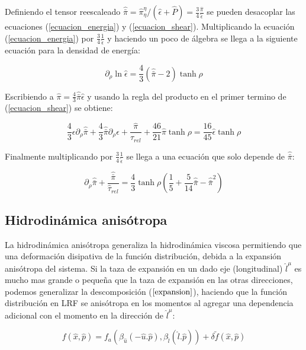 \documentclass[11pt,a4paper]{article}
\begin{document}
Definiendo el tensor reescaleado $\hat{\bar{\pi}}=\hat{\pi}^{\eta}_{\eta}/(\hat{\epsilon}+\hat{P})=\frac{3}{4}\frac{\hat{\pi}}{\hat{\epsilon}}$ se pueden desacoplar las ecuaciones (\ref{ecuacion_energia}) y (\ref{ecuacion_shear}). Multiplicando la ecuación (\ref{ecuacion_energia}) por $\frac{3}{4}\frac{1}{\hat{\epsilon}}$ y haciendo un poco de álgebra se llega a la siguiente ecuación para la densidad de energía:

\begin{equation}
\partial_{\rho}\ln\hat{\epsilon}=
\frac{4}{3}(\hat{\bar{\pi}}-2)\tanh\rho
\end{equation}

Escribiendo a $\hat{\pi}=\frac{4}{3}\hat{\bar{\pi}}\hat{\epsilon}$ y usando la regla del producto en el primer termino de (\ref{ecuacion_shear}) se obtiene:

\begin{equation}
\frac{4}{3}\epsilon\partial_{\rho}\hat{\bar{\pi}}
+\frac{4}{3}\hat{\bar{\pi}}\partial_{\rho}\epsilon
+\frac{\hat{\pi}}{\hat{\tau}_{rel}}
+\frac{46}{21}\hat{\pi}\tanh\rho=
\frac{16}{45}\hat{\epsilon}\tanh\rho
\end{equation}

Finalmente multiplicando por $\frac{3}{4}\frac{1}{\hat{\epsilon}}$ se llega a una ecuación que solo depende de $\hat{\bar{\pi}}$:

\begin{equation}
\partial_{\rho}\hat{\bar{\pi}}+\frac{\hat{\bar{\pi}}}{\hat{\tau}_{rel}}=
\frac{4}{3}\tanh\rho(\frac{1}{5}+\frac{5}{14}\hat{\bar{\pi}}-\hat{\bar{\pi}}^2)
\end{equation}


\subsection{Hidrodinámica anisótropa}

La hidrodinámica anisótropa generaliza la hidrodinámica viscosa permitiendo que una deformación disipativa de la función distribución, debida a la expansión anisótropa del sistema. Si la taza de expansión en un dado eje (longitudinal) $\hat{l}^{\mu}$ es mucho mas grande o pequeña que la taza de expansión en las otras direcciones, podemos generalizar la descomposición ($\ref{expansion}$), haciendo que la función distribución en LRF se anisótropa en los momentos al agregar una dependencia adicional con el momento en la dirección de $\hat{l}^{\mu}$:

\begin{equation}
f( \hat{x}, \hat{p})=
f_{a}(\beta_{\hat{u}}(-\hat{u}.\hat{p}),\beta_{\hat{l}}(\hat{l}.\hat{p}))+{\delta}\widetilde{f}( \hat{x},\hat{p})
\label{expansion_anisotropa}
\end{equation}
\end{document}
